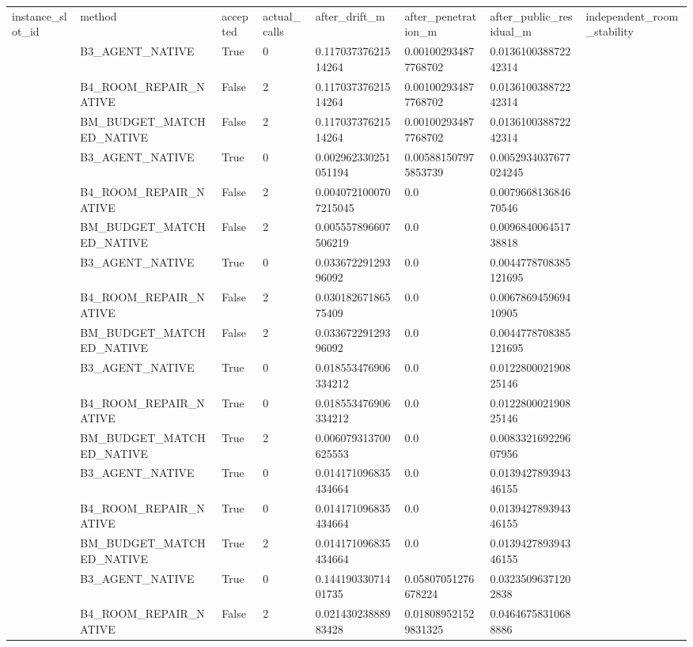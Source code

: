 \begin{tabular}{llllllll}
instance\_slot\_id & method & accepted & actual\_calls & after\_drift\_m & after\_penetration\_m & after\_public\_residual\_m & independent\_room\_stability \\
 & B3\_AGENT\_NATIVE & True & 0 & 0.11703737621514264 & 0.001002934877768702 & 0.013610038872242314 &  \\
 & B4\_ROOM\_REPAIR\_NATIVE & False & 2 & 0.11703737621514264 & 0.001002934877768702 & 0.013610038872242314 &  \\
 & BM\_BUDGET\_MATCHED\_NATIVE & False & 2 & 0.11703737621514264 & 0.001002934877768702 & 0.013610038872242314 &  \\
 & B3\_AGENT\_NATIVE & True & 0 & 0.002962330251051194 & 0.005881507975853739 & 0.0052934037677024245 &  \\
 & B4\_ROOM\_REPAIR\_NATIVE & False & 2 & 0.0040721000707215045 & 0.0 & 0.007966813684670546 &  \\
 & BM\_BUDGET\_MATCHED\_NATIVE & False & 2 & 0.005557896607506219 & 0.0 & 0.009684006451738818 &  \\
 & B3\_AGENT\_NATIVE & True & 0 & 0.03367229129396092 & 0.0 & 0.0044778708385121695 &  \\
 & B4\_ROOM\_REPAIR\_NATIVE & False & 2 & 0.03018267186575409 & 0.0 & 0.006786945969410905 &  \\
 & BM\_BUDGET\_MATCHED\_NATIVE & False & 2 & 0.03367229129396092 & 0.0 & 0.0044778708385121695 &  \\
 & B3\_AGENT\_NATIVE & True & 0 & 0.018553476906334212 & 0.0 & 0.012280002190825146 &  \\
 & B4\_ROOM\_REPAIR\_NATIVE & True & 0 & 0.018553476906334212 & 0.0 & 0.012280002190825146 &  \\
 & BM\_BUDGET\_MATCHED\_NATIVE & True & 2 & 0.006079313700625553 & 0.0 & 0.008332169229607956 &  \\
 & B3\_AGENT\_NATIVE & True & 0 & 0.014171096835434664 & 0.0 & 0.013942789394346155 &  \\
 & B4\_ROOM\_REPAIR\_NATIVE & True & 0 & 0.014171096835434664 & 0.0 & 0.013942789394346155 &  \\
 & BM\_BUDGET\_MATCHED\_NATIVE & True & 2 & 0.014171096835434664 & 0.0 & 0.013942789394346155 &  \\
 & B3\_AGENT\_NATIVE & True & 0 & 0.14419033071401735 & 0.05807051276678224 & 0.03235096371202838 &  \\
 & B4\_ROOM\_REPAIR\_NATIVE & False & 2 & 0.02143023888983428 & 0.018089521529831325 & 0.04646758310688886 &  \\

\end{tabular}
